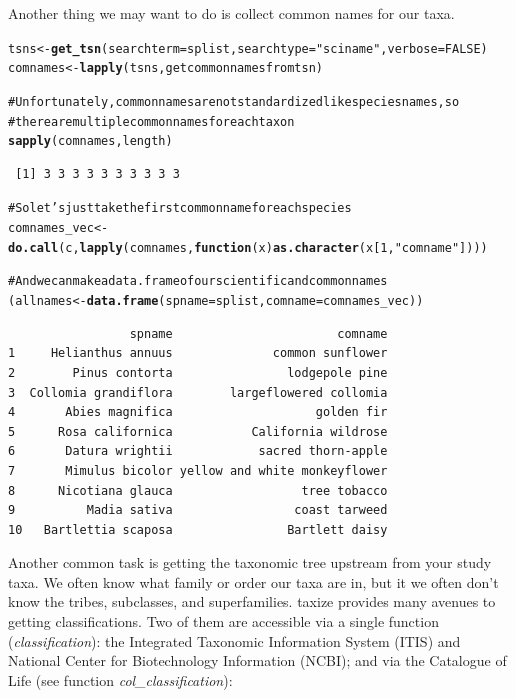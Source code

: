 \documentclass[letterpaper,superscriptaddress,showkeys,longbibliography,10pt]{revtex4-1}\usepackage{graphicx, color}
\makeatletter
\newcommand{\hlfunctioncall}[1]{\textcolor[rgb]{0.501960784313725,0,0.329411764705882}{\textbf{#1}}}%
\newcommand{\hlstring}[1]{\textcolor[rgb]{0.6,0.6,1}{#1}}%
\newcommand{\hlcomment}[1]{\textcolor[rgb]{0.180392156862745,0.6,0.341176470588235}{#1}}%
\newenvironment{kframe}{%
 \def\at@end@of@kframe{}%
 \ifinner\ifhmode%
  \def\at@end@of@kframe{\end{minipage}}%
  \begin{minipage}{\columnwidth}%
 \fi\fi%
 \def\FrameCommand##1{\hskip\@totalleftmargin \hskip-\fboxsep
 \colorbox{shadecolor}{##1}\hskip-\fboxsep
     \hskip-\linewidth \hskip-\@totalleftmargin \hskip\columnwidth}%
 \MakeFramed {\advance\hsize-\width
   \@totalleftmargin\z@ \linewidth\hsize
   \@setminipage}}%
 {\par\unskip\endMakeFramed%
 \at@end@of@kframe}
\newenvironment{knitrout}{}{} %
\makeatother
\begin{document}
\begin{appendices}
Another thing we may want to do is collect common names for our taxa. 

\begin{knitrout}
\color{fgcolor}\begin{kframe}
\begin{alltt}
tsns <- \hlfunctioncall{get_tsn}(searchterm = splist, searchtype = \hlstring{"sciname"}, verbose = FALSE)
comnames <- \hlfunctioncall{lapply}(tsns, getcommonnamesfromtsn)

\hlcomment{# Unfortunately, common names are not standardized like species names, so}
\hlcomment{# there are multiple common names for each taxon}
\hlfunctioncall{sapply}(comnames, length)
\end{alltt}
\begin{verbatim}
 [1] 3 3 3 3 3 3 3 3 3 3
\end{verbatim}
\begin{alltt}

\hlcomment{# So let's just take the first common name for each species}
comnames_vec <- \hlfunctioncall{do.call}(c, \hlfunctioncall{lapply}(comnames, \hlfunctioncall{function}(x) \hlfunctioncall{as.character}(x[1, \hlstring{"comname"}])))

\hlcomment{# And we can make a data.frame of our scientific and common names}
(allnames <- \hlfunctioncall{data.frame}(spname = splist, comname = comnames_vec))
\end{alltt}
\begin{verbatim}
                 spname                       comname
1     Helianthus annuus              common sunflower
2        Pinus contorta                lodgepole pine
3  Collomia grandiflora        largeflowered collomia
4       Abies magnifica                    golden fir
5      Rosa californica           California wildrose
6       Datura wrightii            sacred thorn-apple
7       Mimulus bicolor yellow and white monkeyflower
8      Nicotiana glauca                  tree tobacco
9          Madia sativa                 coast tarweed
10   Bartlettia scaposa                Bartlett daisy
\end{verbatim}
\end{kframe}
\end{knitrout}


Another common task is getting the taxonomic tree upstream from your study taxa. We often know what family or order our taxa are in, but it we often don't know the tribes, subclasses, and superfamilies. taxize provides many avenues to getting classifications. Two of them are accessible via a single function (\emph{classification}): the Integrated Taxonomic Information System (ITIS) and National Center for Biotechnology Information (NCBI); and via the Catalogue of Life (see function \emph{col\_classification}):


\end{appendices}
\end{document}

